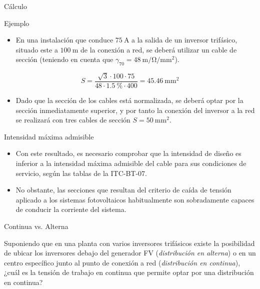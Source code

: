 \documentclass[xcolor={usenames,svgnames,dvipsnames}]{beamer}
\begin{document}
\begin{frame}[label={sec:orgd6bea81}]{Cálculo}
\begin{block}{Ejemplo}
\begin{itemize}
\item En una instalación que conduce \(\SI{75}{\ampere}\) a la salida de un
inversor trifásico, situado este a \(\SI{100}{\meter}\) de la conexión
a red, se deberá utilizar un cable de sección (teniendo en cuenta
que \(\gamma_{70} = \SI{48}{\meter\per\ohm\per\milli\meter\squared}\)).
\end{itemize}


\[
  S=\frac{\sqrt{3} \cdot 100 \cdot 75}{48 \cdot \SI{1.5}{\percent}\cdot400}=\SI{45.46}{\milli\meter\squared}
\]

\begin{itemize}
\item Dado que la sección de los cables está normalizada, se deberá optar
por la sección inmediatamente superior, y por tanto la conexión del
inversor a la red se realizará con tres cables de sección
\(S=\SI{50}{\milli\meter\squared}\).
\end{itemize}
\end{block}
\end{frame}

\begin{frame}[label={sec:orgb6a6550}]{Intensidad máxima admisible}
\begin{itemize}
\item Con este resultado, es necesario comprobar que la intensidad de diseño es inferior a la intensidad máxima admisible del cable para sus condiciones de servicio, según las tablas de la ITC-BT-07.

\item No obstante, las secciones que resultan del criterio de caída de tensión aplicado a los sistemas fotovoltaicos habitualmente son sobradamente capaces de conducir la corriente del sistema.
\end{itemize}
\end{frame}

\begin{frame}[label={sec:org72ec9f0}]{Continua vs. Alterna}
\begin{block}{}
Suponiendo que en una planta con varios inversores trifásicos existe la
posibilidad de ubicar los inversores debajo del generador FV
(\emph{distribución en alterna}) o en un centro específico junto al punto de
conexión a red (\emph{distribución en continua}), \alert{¿cuál es la tensión de
trabajo en continua que permite optar por una distribución en continua?}
\end{block}
\end{frame}
\end{document}
